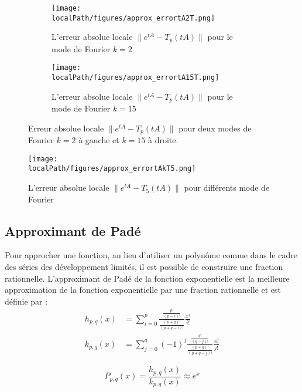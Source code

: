 
\begin{figure}
  \begin{subfigure}{.5\textwidth}
    \centering
    \texttt{[image: \\localPath/figures/approx\_errortA2T.png]}
    \caption{L'erreur absolue locale $\|e^{tA}-T_p(tA)\|$ pour le mode de Fourier $k=2$}
  \end{subfigure}
  \begin{subfigure}{.5\textwidth}
    \centering
    \texttt{[image: \\localPath/figures/approx\_errortA15T.png]}
    \caption{L'erreur absolue locale $\|e^{tA}-T_p(tA)\|$ pour le mode de Fourier $k=15$}
  \end{subfigure}
  \caption{Erreur absolue locale $\|e^{tA}-T_p(tA)\|$ pour deux modes de Fourier $k=2$ à gauche et $k=15$ à droite.}
\end{figure}

\begin{figure}
  \centering
  \texttt{[image: \\localPath/figures/approx\_errortAkT5.png]}
  \caption{L'erreur absolue locale $\|e^{tA}-T_5(tA)\|$ pour différents mode de Fourier}
\end{figure}

\subsection{Approximant de Padé}

Pour approcher une fonction, au lieu d'utiliser un polynôme comme dans le cadre des séries des développement limités, il est possible de construire une fraction rationnelle. L'approximant de Padé de la fonction exponentielle est la meilleure approximation de la fonction exponentielle par une fraction rationnelle et est définie par :
$$
  \begin{aligned}
    h_{p,q}(x) &= \sum_{i=0}^p \frac{\frac{p!}{(p-i)!}}{\frac{(p+q)!}{(p+q-i)!}}\frac{x^i}{i!} \\
    k_{p,q}(x) &= \sum_{j=0}^q (-1)^j \frac{\frac{q!}{(q-j)!}}{\frac{(p+q)!}{(p+q-j)!}} \frac{x^j}{j!}
  \end{aligned}
$$

$$
  P_{p,q}(x) = \frac{h_{p,q}(x)}{k_{p,q}(x)} \approx e^x
$$

